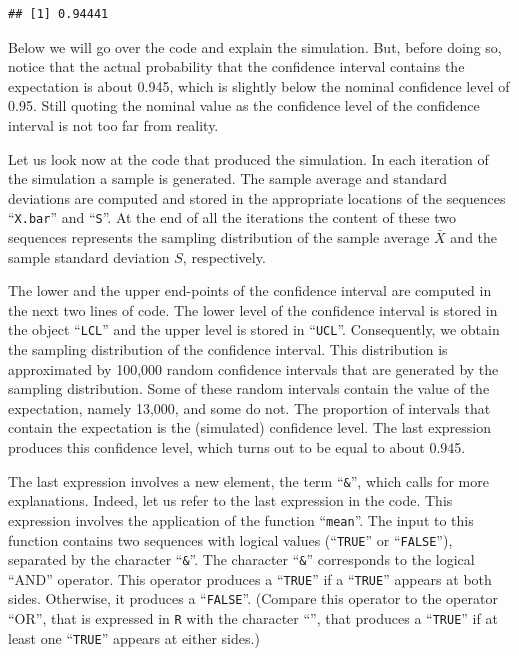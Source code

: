 \documentclass[
]{krantz}
\theoremstyle{definition}
\theoremstyle{definition}
\theoremstyle{definition}
\theoremstyle{remark}
\begin{document}
\begin{verbatim}
## [1] 0.94441
\end{verbatim}

Below we will go over the code and explain the simulation. But, before
doing so, notice that the actual probability that the confidence
interval contains the expectation is about 0.945, which is slightly
below the nominal confidence level of 0.95. Still quoting the nominal
value as the confidence level of the confidence interval is not too far
from reality.

Let us look now at the code that produced the simulation. In each
iteration of the simulation a sample is generated. The sample average
and standard deviations are computed and stored in the appropriate
locations of the sequences ``\texttt{X.bar}'' and ``\texttt{S}''. At the end of all the
iterations the content of these two sequences represents the sampling
distribution of the sample average \(\bar X\) and the sample standard
deviation \(S\), respectively.

The lower and the upper end-points of the confidence interval are
computed in the next two lines of code. The lower level of the
confidence interval is stored in the object ``\texttt{LCL}'' and the upper level
is stored in ``\texttt{UCL}''. Consequently, we obtain the sampling distribution
of the confidence interval. This distribution is approximated by 100,000
random confidence intervals that are generated by the sampling
distribution. Some of these random intervals contain the value of the
expectation, namely 13,000, and some do not. The proportion of intervals
that contain the expectation is the (simulated) confidence level. The
last expression produces this confidence level, which turns out to be
equal to about 0.945.

The last expression involves a new element, the term ``\texttt{\&}'', which calls
for more explanations. Indeed, let us refer to the last expression in
the code. This expression involves the application of the function
``\texttt{mean}''. The input to this function contains two sequences with logical
values (``\texttt{TRUE}'' or ``\texttt{FALSE}''), separated by the character ``\texttt{\&}''. The
character ``\texttt{\&}'' corresponds to the logical ``AND'' operator. This operator
produces a ``\texttt{TRUE}'' if a ``\texttt{TRUE}'' appears at both sides. Otherwise, it
produces a ``\texttt{FALSE}''. (Compare this operator to the operator ``OR'', that
is expressed in \texttt{R} with the character ``\texttt{\textbar{}}'', that produces a ``\texttt{TRUE}''
if at least one ``\texttt{TRUE}'' appears at either sides.)
\end{document}
